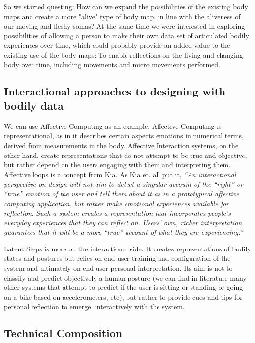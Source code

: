 So we started questing: How can we expand the possibilities of the existing body maps and create a more "alive" type of body map, in line with the aliveness of our moving and fleshy somas? At the same time we were interested in exploring possibilities of allowing a person to make their own data set of articulated bodily experiences over time, which could probably provide an added value to the existing use of the body maps: To enable reflections on the living and changing body over time, including movements and micro movements performed.

\subsection{Interactional approaches to designing with bodily data}

We can use Affective Computing as an example. Affective Computing is representational, as in it describes certain aspects emotions in numerical terms, derived from measurements in the body. Affective Interaction systems, on the other hand, create representations that do not attempt to be true and objective, but rather depend on the users engaging with them and interpreting them. Affective loops is a concept from Kia. As Kia et. all put it, \textit{“An interactional perspective on design will not aim to detect a singular account of the “right” or “true” emotion of the user and tell them about it as in a prototypical affective computing application, but rather make emotional experiences available for reflection. Such a system creates a representation that incorporates people’s everyday experiences that they can reflect on. Users’ own, richer interpretation guarantees that it will be a more “true” account of what they are experiencing.”}

Latent Steps is more on the interactional side. It creates representations of bodily states and postures but relies on end-user training and configuration of the system and ultimately on end-user personal interpretation. Its aim is not to classify and predict objectively a human posture (we can find in literature many other systems that attempt to predict if the user is sitting or standing or going on a bike based on accelerometers, etc), but rather to provide cues and tips for personal reflection to emerge, interactively with the system.

\subsection{Technical Composition}

